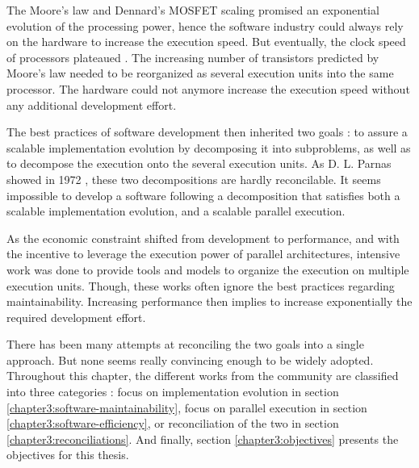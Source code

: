 The Moore's law \cite{Moore1965} and Dennard's MOSFET scaling \cite{Dennard2007} promised an exponential evolution of the processing power, hence the software industry could always rely on the hardware to increase the execution speed.
But eventually, the clock speed of processors plateaued \cite{Bohr2007}.
The increasing number of transistors predicted by Moore's law needed to be reorganized as several execution units into the same processor.
The hardware could not anymore increase the execution speed without any additional development effort.

The best practices of software development then inherited two goals : to assure a scalable implementation evolution by decomposing it into subproblems, as well as to decompose the execution onto the several execution units.
As D. L. Parnas showed in 1972 \cite{Parnas1972}, these two decompositions are hardly reconcilable.
It seems impossible to develop a software following a decomposition that satisfies both a scalable implementation evolution, and a scalable parallel execution.

As the economic constraint shifted from development to performance, and with the incentive to leverage the execution power of parallel architectures, intensive work was done to provide tools and models to organize the execution on multiple execution units.
Though, these works often ignore the best practices regarding maintainability.
Increasing performance then implies to increase exponentially the required development effort.

There has been many attempts at reconciling the two goals into a single approach.
But none seems really convincing enough to be widely adopted.
Throughout this chapter, the different works from the community are classified into three categories : focus on implementation evolution in section \ref{chapter3:software-maintainability}, focus on parallel execution in section \ref{chapter3:software-efficiency}, or reconciliation of the two in section \ref{chapter3:reconciliations}.
And finally, section \ref{chapter3:objectives} presents the objectives for this thesis.








